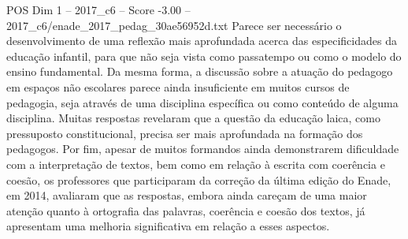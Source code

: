 \begin{textsample}{POS Dim 1 – 2017\_c6 – Score -3.00 – 2017\_c6/enade\_2017\_pedag\_30ae56952d.txt}
Parece ser necessário o desenvolvimento de uma reflexão mais aprofundada acerca das especificidades da educação infantil, para que não seja vista como passatempo ou como o modelo do ensino fundamental.
Da mesma forma, a discussão sobre a atuação do pedagogo em espaços não escolares parece ainda insuficiente em muitos cursos de pedagogia, seja através de uma disciplina específica ou como conteúdo de alguma disciplina.
Muitas respostas revelaram que a questão da educação laica, como pressuposto constitucional, precisa ser mais aprofundada na formação dos pedagogos.
Por fim, apesar de muitos formandos ainda demonstrarem dificuldade com a interpretação de textos, bem como em relação à escrita com coerência e coesão, os professores que participaram da correção da última edição do Enade, em 2014, avaliaram que as respostas, embora ainda careçam de uma maior atenção quanto à ortografia das palavras, coerência e coesão dos textos, já apresentam uma melhoria significativa em relação a esses aspectos.

\end{textsample}
